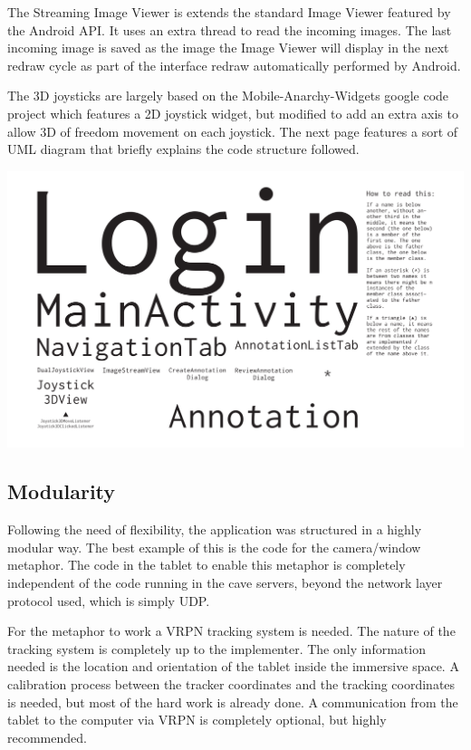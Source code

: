 The Streaming Image Viewer is extends the standard Image Viewer featured by the Android API. It uses an extra thread to read the incoming images. The last incoming image is saved as the image the Image Viewer will display in the next redraw cycle as part of the interface redraw automatically performed by Android.

The 3D joysticks are largely based on the Mobile-Anarchy-Widgets google code project which features a 2D joystick widget, but modified to add an extra axis to allow 3D of freedom movement on each joystick. The next page features a sort of UML diagram that briefly explains the code structure followed.


\begin{center}
\includegraphics[scale=0.5,angle=270]{Images/tablet_uml.pdf}
\end{center}

\subsection{Modularity}

Following the need of flexibility, the application was structured in a highly modular way. The best example of this is the code for the camera/window metaphor. The code in the tablet to enable this metaphor is completely independent of the code running in the cave servers, beyond the network layer protocol used, which is simply UDP.

For the metaphor to work a VRPN tracking system is needed. The nature of the tracking system is completely up to the implementer. The only information needed is the location and orientation of the tablet inside the immersive space. A calibration process between the tracker coordinates and the tracking coordinates is needed, but most of the hard work is already done. A communication from the tablet to the computer via VRPN is completely optional, but highly recommended.